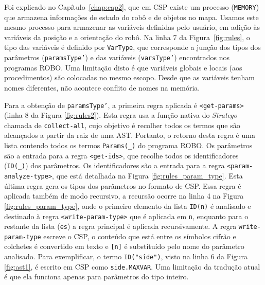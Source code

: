 Foi explicado no Capítulo~\ref{chap:cap2}, que em CSP existe um processo (\texttt{MEMORY}) que armazena informações de estado do robô e de objetos no mapa. Usamos este mesmo processo para armazenar as variáveis definidas pelo usuário, em adição às variáveis da posição e a orientação do robô. Na linha 7 da Figura~\ref{fig:rules}, o tipo das variáveis é definido por \texttt{VarType}, que corresponde a junção dos tipos dos parâmetros (\texttt{paramsType'}) e das variáveis (\texttt{varsType'}) encontrados nos programas ROBO. Uma limitação disto é que variáveis globais e locais (aos procedimentos) são colocadas no mesmo escopo. Desde que as variáveis tenham nomes diferentes, não acontece conflito de nomes na memória.   

Para a obtenção de \texttt{paramsType'}, a primeira regra aplicada é \texttt{<get-params>} (linha 8 da Figura \ref{fig:rules2}). Esta regra usa a função nativa do \textit{Stratego} chamada de \texttt{collect-all}, cujo objetivo é recolher todos os termos que são alcançados a partir da raiz de uma AST. Portanto, o retorno desta regra é uma lista contendo todos os termos \texttt{Params(\_)} do programa ROBO. Os parâmetros são a entrada para a regra \texttt{<get-ids>}, que recolhe todos os identificadores (\texttt{ID(\_)}) dos parâmetros. Os identificadores são a entrada para a regra \texttt{<param-analyze-type>}, que está detalhada na Figura \ref{fig:rules_param_type}. Esta última regra gera os tipos dos parâmetros no formato de CSP. Essa regra é aplicada também de modo recursivo, a recursão ocorre na linha 4 na Figura \ref{fig:rules_param_type}, onde o primeiro elemento da lista \texttt{ID(n)} é analisado e destinado à regra \texttt{<write-param-type>} que é aplicada em \texttt{n}, enquanto para o restante da lista (\texttt{es}) a regra principal é aplicada recursivamente. A regra \texttt{write-param-type} escreve o CSP, o conteúdo que está entre os símbolos cifrão e colchetes é convertido em texto e \texttt{[n]} é substituído pelo nome do parâmetro analisado. Para exemplificar, o termo \texttt{ID("side")}, visto na linha 6 da Figura \ref{fig:ast1}, é escrito em CSP como \texttt{side.MAXVAR}. Uma limitação da tradução atual é que ela funciona apenas para parâmetros do tipo inteiro.

